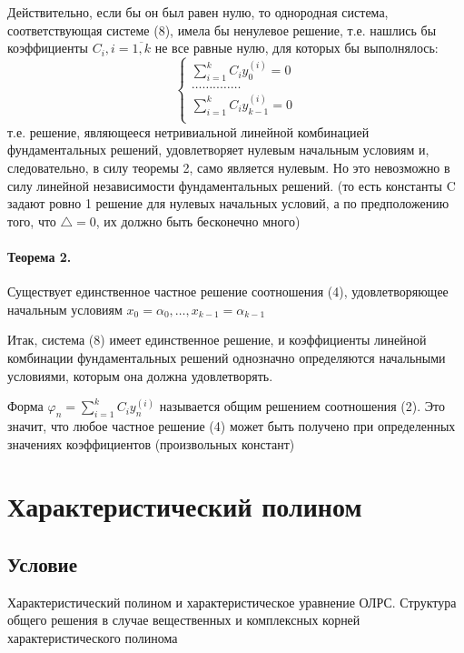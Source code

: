 \documentclass{report}
\begin{document}
Действительно, если бы он был равен нулю, то однородная
система, соответствующая системе (8), имела бы ненулевое
решение, т.е. нашлись бы коэффициенты $C_{i}, i = \overline{1,k}$ не все
равные нулю, для которых бы выполнялось:
\[
\begin{cases}
	\sum\limits_{i=1}^{k}C_{i}y_0^{(i)} = 0\\
	\ldots\ldots..\ldots\ldots\\
	\sum\limits_{i=1}^{k}C_{i}y_{k-1}^{(i)} = 0\\
\end{cases}
\] 
т.е. решение, являющееся нетривиальной линейной комбинацией
фундаментальных решений, удовлетворяет нулевым начальным
условиям и, следовательно, в силу теоремы 2, само является
нулевым. Но это невозможно в силу линейной независимости
фундаментальных решений. (то есть константы C задают ровно 1 решение для 
нулевых начальных условий, а по предположению того, что $\triangle = 0$, их
должно быть бесконечно много)

\paragraph*{Теорема 2.}
Существует единственное частное решение
соотношения (4), удовлетворяющее начальным условиям
$x_0=\alpha_0, \ldots, x_{k-1} = \alpha_{k-1}$

\medskip

Итак, система (8) имеет единственное решение, и
коэффициенты линейной комбинации фундаментальных решений
однозначно определяются начальными условиями, которым она
должна удовлетворять.

\medskip

Форма $\varphi_{n} = \sum\limits_{i=1}^{k}C_{i}y^{(i)}_{n}$
называется общим решением соотношения (2).
Это значит, что любое частное решение (4)
может быть получено при определенных значениях
коэффициентов (произвольных констант)

\newpage

\section{Характеристический полином}
\subsection{Условие}
Характеристический полином и характеристическое уравнение ОЛРС. Структура
общего решения в случае вещественных и комплексных корней характеристического
полинома
\end{document}
